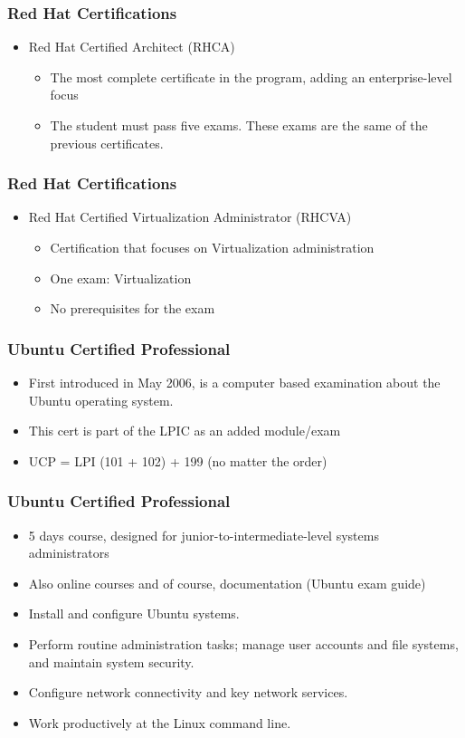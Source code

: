\documentclass{beamer}
\begin{document}
\begin{frame}
\frametitle{Red Hat Certifications}
\begin{itemize}
\item Red Hat Certified Architect (RHCA)
\begin {itemize}
\item The most complete certificate in the program, adding an enterprise-level focus
\item The student must pass five exams. These exams are the same of the previous certificates. 

\end {itemize}
\end{itemize}
\end{frame}

\begin{frame}
\frametitle{Red Hat Certifications}
\begin{itemize}
\item Red Hat Certified Virtualization Administrator (RHCVA)
\begin {itemize}
\item Certification that focuses on Virtualization administration
\item One exam: Virtualization
\item No prerequisites for the exam
\end {itemize}
\end{itemize}
\end{frame}


\begin{frame}
\frametitle{Ubuntu Certified Professional}
\begin{itemize}
\item First introduced in May 2006, is a computer based examination about the Ubuntu operating system.
\item This cert is part of the LPIC as an added module/exam
\item UCP = LPI (101 + 102) + 199  (no matter the order)

\end{itemize}
\end{frame}



\begin{frame}
\frametitle{Ubuntu Certified Professional}
\begin{itemize}
\item 5 days course, designed for junior-to-intermediate-level systems administrators
\item Also online courses and of course, documentation (Ubuntu exam guide)
\item Install and configure Ubuntu systems.
\item Perform routine administration tasks; manage user accounts and file systems, and maintain system security.
\item Configure network connectivity and key network services.
\item Work productively at the Linux command line.

\end{itemize}
\end{frame}
\end{document}

